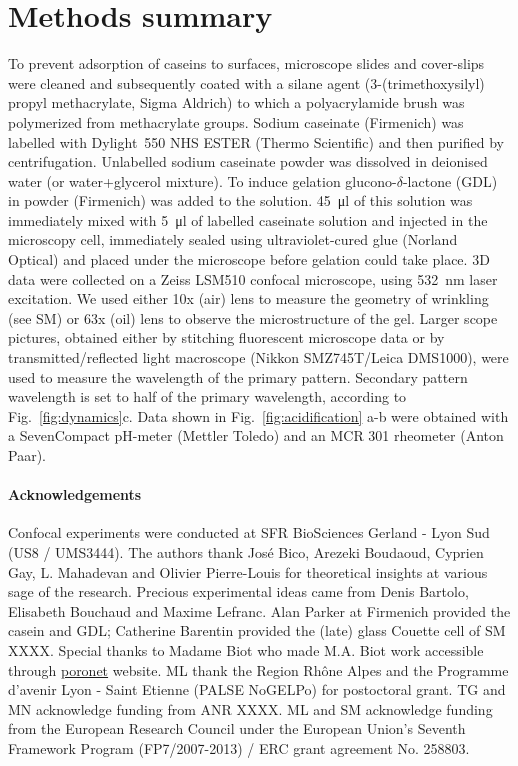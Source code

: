 \documentclass[twocolumn,superscriptaddress,showpacs,preprintnumbers,amsmath,amssymb,prl]{revtex4-1}
\begin{document}
\section*{Methods summary}
To prevent adsorption of caseins to surfaces, microscope slides and cover-slips were cleaned and subsequently coated with a silane agent (3-(trimethoxysilyl) propyl methacrylate, Sigma Aldrich) to which a polyacrylamide brush was polymerized from methacrylate groups.
Sodium caseinate (Firmenich) was labelled with Dylight~550 NHS ESTER (Thermo Scientific) and then purified by centrifugation. Unlabelled sodium caseinate powder was dissolved in deionised water (or water+glycerol mixture). To induce gelation glucono-$\delta$-lactone (GDL) in powder (Firmenich) was added to the solution. \SI{45}{\micro\litre} of this solution was immediately mixed with \SI{5}{\micro\litre} of labelled caseinate solution and injected in the microscopy cell, immediately sealed using ultraviolet-cured glue (Norland Optical) and placed under the microscope before gelation could take place. 
3D data were collected on a Zeiss LSM510 confocal microscope, using \SI{532}{\nano\meter} laser excitation. We used either 10x (air) lens to measure the geometry of wrinkling (see SM) or 63x (oil) lens to observe the microstructure of the gel. Larger scope pictures, obtained either by stitching fluorescent microscope data or by transmitted/reflected light macroscope (Nikkon SMZ745T/Leica DMS1000), were used to measure the wavelength of the primary pattern. Secondary pattern wavelength is set to half of the primary wavelength, according to Fig.~\ref{fig:dynamics}c.
Data shown in Fig.~\ref{fig:acidification} a-b were obtained with a SevenCompact pH-meter (Mettler Toledo) and an MCR 301 rheometer (Anton Paar).



\paragraph*{Acknowledgements}
Confocal experiments were conducted at SFR BioSciences Gerland - Lyon Sud (US8 / UMS3444).
The authors thank José Bico, Arezeki Boudaoud, Cyprien Gay, L. Mahadevan and Olivier Pierre-Louis for theoretical insights at various sage of the research. 
Precious experimental ideas came from Denis Bartolo, Elisabeth Bouchaud and Maxime Lefranc.
Alan Parker at Firmenich provided the casein and GDL; Catherine Barentin provided the (late) glass Couette cell of SM XXXX.
Special thanks to Madame Biot who made M.A. Biot work accessible through \href{http://www.olemiss.edu/sciencenet/poronet/}{poronet} website. 
ML thank the Region Rhône Alpes and the Programme d'avenir Lyon - Saint Etienne (PALSE NoGELPo) for postoctoral grant. 
TG and MN acknowledge funding from ANR XXXX. 
ML and SM acknowledge funding from the European Research Council under the European Union's Seventh Framework Program (FP7/2007-2013) / ERC grant agreement No. 258803.
\end{document}
